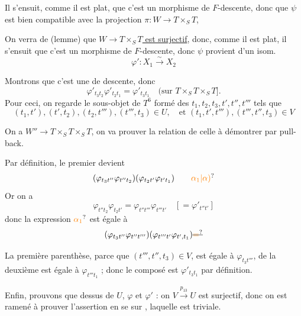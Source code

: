 Il s'ensuit, comme il est plat, que c'est un morphisme de $F$-descente, donc que $\psi$ est bien compatible avec la projection $\pi:W\to T\times_S T$,

On verra de  (lemme) que \uline{$W\to T\times_S T$ est surjectif}, donc, comme il est plat, il s'ensuit que c'est un morphisme de $F$-descente, donc $\psi$ provient d'un isom.
\[
\varphi':X_1\xrightarrow{\sim}X_2
\]

Montrons que c'est une   de descente, donc
\[
\varphi'_{t_3t_2}\varphi'_{t_2t_1}=\varphi'_{t_3t_1}\quad (\text{sur }T\times_S T\times_S T].
\]
Pour ceci, on regarde le  sous-objet   de $T^6$ formé des $t_1,t_2,t_3,t',t'',t'''$ tels que
\[
(t_1,t'),(t',t_2),(t_2,t'''),(t''',t_3)\in U,\quad\text{et }(t_1,t',t'''),(t''',t'',t_3)\in V
\]


On a $W''\to T\times_S T\times_S T$, on va prouver la relation  de celle à démontrer par pull-back.

Par définition, le premier  devient
\[
(\varphi_{t_3t''}\varphi_{t''t_2})(\varphi_{t_2t'}\varphi_{t't_1})\tag*{\unsure{$\alpha_1$|$\alpha)$}}
\]
Or on a
\[
\varphi_{t''t_2}\varphi_{t_2t'}=\varphi_{t''t'''}\varphi_{t'''t'}\quad [=\varphi'_{t''t'}]
\]
donc la  expression $\unsure{\alpha_1}$ est égale à
\[
(\varphi_{t_3t''}\varphi_{t''t'''})
(\varphi_{t'''t'}\varphi_{t',t_1})\deleted{\unsure{=}}
\]

La première parenthèse, parce que $(t''',t'',t_3)\in V$, est égale à $\varphi_{t_3t'''}$, de  la deuxième est égale à $\varphi_{t'''t_1}$ ; donc le composé est $\varphi'_{t_3t_1}$ par définition.

Enfin, prouvons que  dessus de $U$, $\varphi$ et $\varphi'$  : on   $V\xrightarrow{p_{13}}U$ est surjectif,  donc on est ramené à prouver l'assertion  en se  sur , laquelle est triviale.

